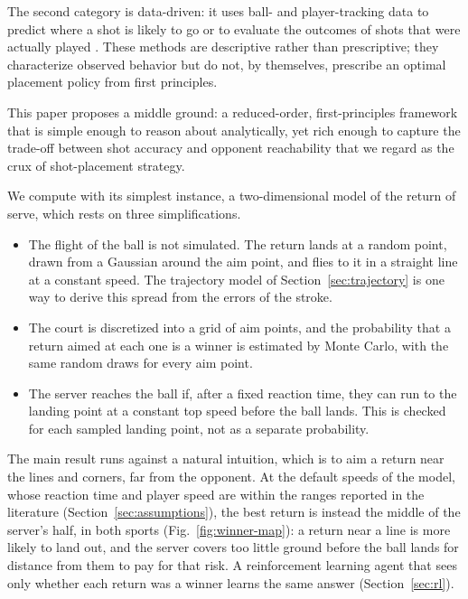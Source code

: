   The second category is data-driven: it uses ball- and player-tracking data to
  predict where a shot is likely to go \cite{wei2013shotlocations} or to
  evaluate the outcomes of shots that were actually played
  \cite{kovalchik2020voncramm}. These methods are descriptive rather than
  prescriptive; they characterize observed behavior but do not, by themselves,
  prescribe an optimal placement policy from first principles.

  This paper proposes a middle ground: a reduced-order, first-principles
  framework that is simple enough to reason about analytically, yet rich enough
  to capture the trade-off between shot accuracy and opponent reachability that
  we regard as the crux of shot-placement strategy.

  We compute with its simplest instance, a two-dimensional model of the return
  of serve, which rests on three simplifications.

  \begin{itemize}
    \item The flight of the ball is not simulated. The return lands at a random
    point, drawn from a Gaussian around the aim point, and flies to it in a
    straight line at a constant speed. The trajectory model of
    Section~\ref{sec:trajectory} is one way to derive this spread from the
    errors of the stroke.

    \item The court is discretized into a grid of aim points, and the
    probability that a return aimed at each one is a winner is estimated by
    Monte Carlo, with the same random draws for every aim point.

    \item The server reaches the ball if, after a fixed reaction time, they can
    run to the landing point at a constant top speed before the ball lands. This
    is checked for each sampled landing point, not as a separate probability.
  \end{itemize}

  The main result runs against a natural intuition, which is to aim a return
  near the lines and corners, far from the opponent.
  At the default speeds of the model, whose reaction time and player speed are
  within the ranges reported in the literature
  (Section~\ref{sec:assumptions}), the best return is instead the middle of the
  server's half, in both sports (Fig.~\ref{fig:winner-map}): a return near a
  line is more likely to land out, and the server covers too little ground
  before the ball lands for distance from them to pay for that risk. A
  reinforcement learning agent that sees only whether each return was a winner
  learns the same answer (Section~\ref{sec:rl}).

